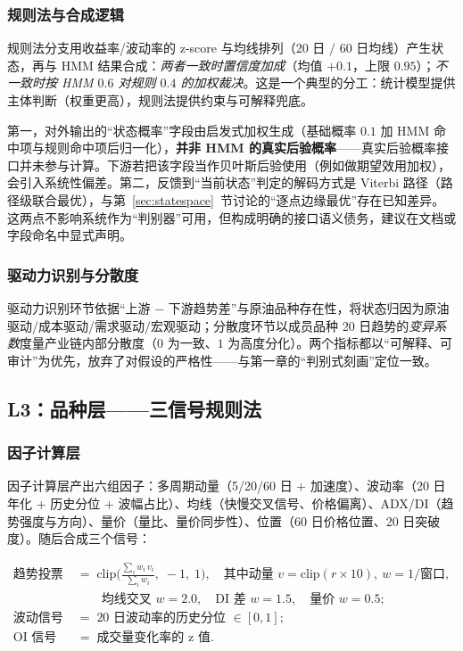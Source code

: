 \subsubsection{规则法与合成逻辑}

规则法分支用收益率/波动率的 z-score 与均线排列（20 日 $/$ 60 日均线）产生状态，再与 HMM 结果合成：\emph{两者一致时置信度加成}（均值 $+ 0.1$，上限 $0.95$）；\emph{不一致时按 HMM $0.6$ 对规则 $0.4$ 的加权裁决}。这是一个典型的分工：统计模型提供主体判断（权重更高），规则法提供约束与可解释兜底。

\begin{remark}[两个必须如实记录的实现细节]
第一，对外输出的“状态概率”字段由启发式加权生成（基础概率 $0.1$ 加 HMM 命中项与规则命中项后归一化），\textbf{并非 HMM 的真实后验概率}——真实后验概率接口并未参与计算。下游若把该字段当作贝叶斯后验使用（例如做期望效用加权），会引入系统性偏差。第二，反馈到“当前状态”判定的解码方式是 Viterbi 路径（路径级联合最优），与第~\ref{sec:statespace}~节讨论的“逐点边缘最优”存在已知差异。这两点不影响系统作为“判别器”可用，但构成明确的接口语义债务，建议在文档或字段命名中显式声明。
\end{remark}

\subsubsection{驱动力识别与分散度}

驱动力识别环节依据“上游 $-$ 下游趋势差”与原油品种存在性，将状态归因为原油驱动/成本驱动/需求驱动/宏观驱动；分散度环节以成员品种 20 日趋势的\emph{变异系数}度量产业链内部分散度（$0$ 为一致、$1$ 为高度分化）。两个指标都以“可解释、可审计”为优先，放弃了对假设的严格性——与第一章的“判别式刻画”定位一致。

\subsection{L3：品种层——三信号规则法}

\subsubsection{因子计算层}

因子计算层产出六组因子：多周期动量（5/20/60 日 $+$ 加速度）、波动率（20 日年化 $+$ 历史分位 $+$ 波幅占比）、均线（快慢交叉信号、价格偏离）、ADX/DI（趋势强度与方向）、量价（量比、量价同步性）、位置（60 日价格位置、20 日突破度）。随后合成三个信号：

\begin{align}
\text{趋势投票}\;&=\;\mathrm{clip}\Big(\frac{\sum_i w_i\, v_i}{\sum_i w_i},\; -1,\; 1\Big), \quad
\text{其中动量 } v = \mathrm{clip}(r \times 10),\ w = 1/\text{窗口},\\
&\qquad\text{均线交叉 } w = 2.0,\quad \text{DI 差 } w = 1.5,\quad \text{量价 } w = 0.5;\\
\text{波动信号}\;&=\;\text{20 日波动率的历史分位 } \in [0,1];\\
\text{OI 信号}\;&=\;\text{成交量变化率的 z 值}.
\end{align}

